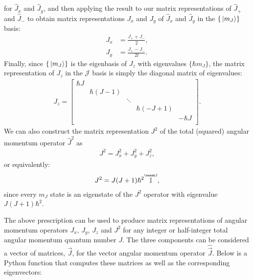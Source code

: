 for $\hat J_x$ and $\hat J_y$, and then applying the result to our matrix representations of $\hat J_+$ and $\hat J_-$ to obtain matrix representations $J_x$ and $J_y$ of $\hat J_x$ and $\hat J_y$ in the $\{\ket{m_J}\}$ basis:
\begin{align}
J_x &= \frac{J_+ + J_-}{2},\\
J_y &= \frac{J_+ - J_-}{2\ii}.
\end{align}
Finally, since $\{\ket{m_J}\}$ is the eigenbasis of $J_z$ with eigenvalues $\{\hbar m_J\}$, the matrix representation of $J_z$ in the $\mathcal{J}$ basis is simply the diagonal matrix of eigenvalues:
\begin{align}
J_z = \left[\begin{smallmatrix}
\hbar J\\
& \hbar (J - 1)\\
& & \ddots\\
& & & \hbar (- J + 1)\\
& & & & -\hbar J\\
\end{smallmatrix} \right].
\end{align} 
We can also construct the matrix representation $J^2$ of the total (squared) angular momentum operator $\hat J^2$ as
\begin{align}
J^2 = J_x^2 + J_y^2 + J_z^2, 
\end{align} 
or equivalently:
\begin{align}
J^2 = J(J+1)\hbar^2 \oversetJ{\mathbb{I}},
\end{align}
since every $m_J$ state is an eigenstate of the $J^2$ operator with eigenvalue $J(J+1)\hbar^2$.

The above prescription can be used to produce matrix representations of angular momentum operators $J_x$, $J_y$, $J_z$ and $J^2$ for any integer or half-integer total angular momentum quantum number $J$. The three components can be considered a vector of matrices, $\vec J$, for the vector angular momentum operator $\hat {\vec J}$. Below is a Python function that computes these matrices as well as the corresponding eigenvectors:


